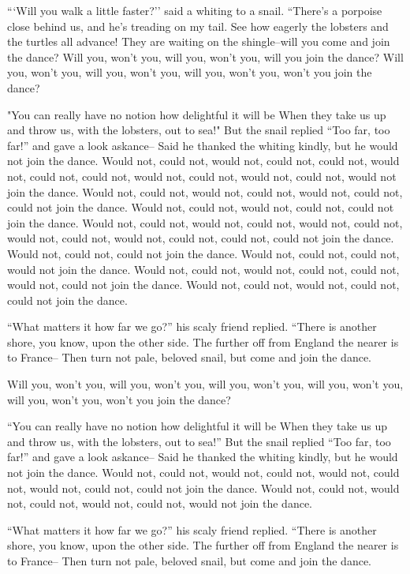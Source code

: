 \documentclass[statementpaper,twoside,openany]{memoir}
\begin{document}
```Will you walk a little faster?'' said a whiting to a snail. ``There's a porpoise close behind us, and he's treading on my tail. See how eagerly the lobsters and the turtles all advance! They are waiting on the shingle--will you come and join the dance? Will you, won't you, will you, won't you, will you join the dance? Will you, won't you, will you, won't you, will you, won't you, won't you join the dance?

"You can really have no notion how delightful it will be When they take us up and throw us, with the lobsters, out to sea!" But the snail replied ``Too far, too far!'' and gave a look askance-- Said he thanked the whiting kindly, but he would not join the dance. Would not, could not, would not, could not, could not, would not, could not, could not, would not, could not, would not, could not, would not join the dance. Would not, could not, would not, could not, would not, could not, could not join the dance. Would not, could not, would not, could not, could not join the dance. Would not, could not, would not, could not, would not, could not, would not, could not, would not, could not, could not, could not join the dance. Would not, could not, could not join the dance. Would not, could not, could not, would not join the dance. Would not, could not, would not, could not, could not, would not, could not join the dance. Would not, could not, would not, could not, could not join the dance.

``What matters it how far we go?'' his scaly friend replied. ``There is another shore, you know, upon the other side. The further off from England the nearer is to France-- Then turn not pale, beloved snail, but come and join the dance.

Will you, won't you, will you, won't you, will you, won't you, will you, won't you, will you, won't you, won't you join the dance?

``You can really have no notion how delightful it will be When they take us up and throw us, with the lobsters, out to sea!'' But the snail replied ``Too far, too far!'' and gave a look askance-- Said he thanked the whiting kindly, but he would not join the dance. Would not, could not, would not, could not, would not, could not, would not, could not, could not join the dance. Would not, could not, would not, could not, would not, could not, would not join the dance.

``What matters it how far we go?'' his scaly friend replied. ``There is another shore, you know, upon the other side. The further off from England the nearer is to France-- Then turn not pale, beloved snail, but come and join the dance.
\end{document}
